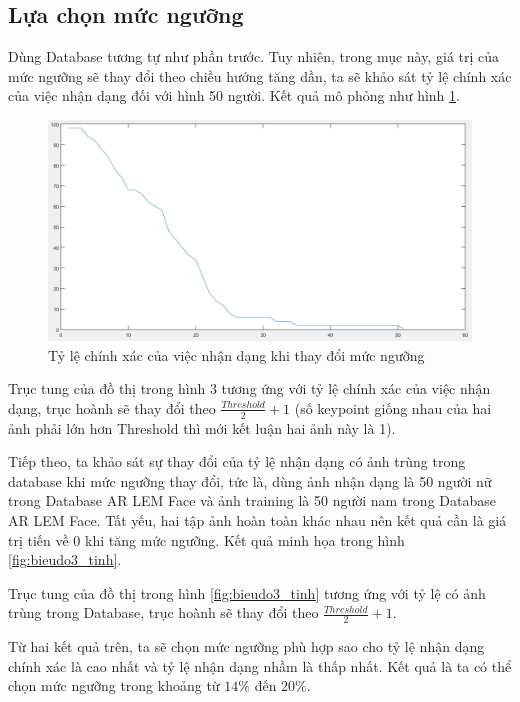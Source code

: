 \documentclass[conference]{IEEEtran}
\begin{document}
\subsection{Lựa chọn mức ngưỡng}
Dùng Database tương tự như phần trước. Tuy nhiên, trong mục này, giá trị của mức ngưỡng sẽ thay đổi theo chiều hướng tăng dần, ta sẽ khảo sát tỷ lệ chính xác của việc nhận dạng đối với hình 50 người. Kết quả mô phỏng như hình \ref{fig:bieudo2_tinh}.
\begin{figure}
  \includegraphics[width=\linewidth]{bieudo2_tinh}
  \caption{Tỷ lệ chính xác của việc nhận dạng khi thay đổi mức ngưỡng}
  \label{fig:bieudo2_tinh}
\end{figure} 

Trục tung của đồ thị trong hình 3 tương ứng với tỷ lệ chính xác của việc nhận dạng, trục hoành sẽ thay đổi theo  $\frac{Threshold}{2} + 1$ (số keypoint giống nhau của hai ảnh phải lớn hơn Threshold thì mới kết luận hai ảnh này là 1).

Tiếp theo, ta khảo sát sự thay đổi của tỷ lệ nhận dạng có ảnh trùng trong database khi mức ngưỡng thay đổi, tức là, dùng ảnh nhận dạng là 50 người nữ trong Database AR LEM Face và ảnh training là 50 người nam trong Database AR LEM Face. Tất yếu, hai tập ảnh hoàn toàn khác nhau nên kết quả cần là giá trị tiến về 0 khi tăng mức ngưỡng. Kết quả minh họa trong hình \ref{fig:bieudo3_tinh}.

Trục tung của đồ thị trong hình \ref{fig:bieudo3_tinh} tương ứng với tỷ lệ có ảnh trùng trong Database, trục hoành sẽ thay đổi theo  $\frac{Threshold}{2} + 1$.

Từ hai kết quả trên, ta sẽ chọn mức ngưỡng phù hợp sao cho tỷ lệ nhận dạng chính xác là cao nhất và tỷ lệ nhận dạng nhầm là thấp nhất. Kết quả là ta có thể chọn mức ngưỡng trong khoảng từ $14\%$ đến $20\%$.
\end{document}
